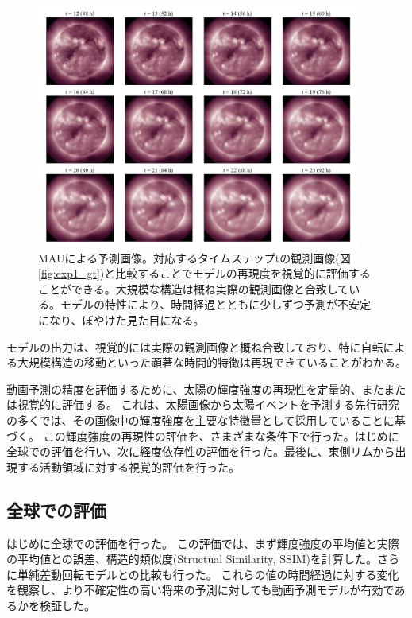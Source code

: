     \begin{figure}[htbp]
      \centering
      \includegraphics[width=0.95\textwidth]{figures/exp1/pd.png}
      \caption{MAUによる予測画像。対応するタイムステップtの観測画像(図\ref{fig:exp1_gt})と比較することでモデルの再現度を視覚的に評価することができる。大規模な構造は概ね実際の観測画像と合致している。モデルの特性により、時間経過とともに少しずつ予測が不安定になり、ぼやけた見た目になる。}
      \label{fig:exp1_pd}
    \end{figure}
    モデルの出力は、視覚的には実際の観測画像と概ね合致しており、特に自転による大規模構造の移動といった顕著な時間的特徴は再現できていることがわかる。

    動画予測の精度を評価するために、太陽の輝度強度の再現性を定量的、またまたは視覚的に評価する。
    これは、太陽画像から太陽イベントを予測する先行研究の多くでは、その画像中の輝度強度を主要な特徴量として採用していることに基づく。
    この輝度強度の再現性の評価を、さまざまな条件下で行った。はじめに全球での評価を行い、次に経度依存性の評価を行った。最後に、東側リムから出現する活動領域に対する視覚的評価を行った。


    \subsection{全球での評価}
      はじめに全球での評価を行った。
      この評価では、まず輝度強度の平均値と実際の平均値との誤差、構造的類似度(Structual Similarity, SSIM)を計算した。さらに単純差動回転モデルとの比較も行った。
      これらの値の時間経過に対する変化を観察し、より不確定性の高い将来の予測に対しても動画予測モデルが有効であるかを検証した。
      

